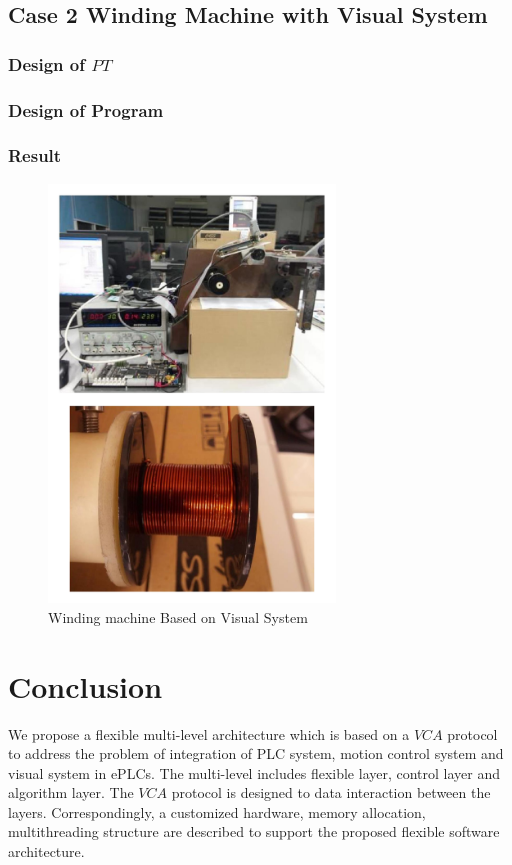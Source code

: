 \documentclass[journal,UTF8]{IEEEtran}
\begin{document}
\subsection{Case 2 Winding Machine with Visual System}

\subsubsection{Design of $PT$}

\subsubsection{Design of Program}

\subsubsection{Result}
\begin{figure}
	\centering
	\includegraphics[width=3in]{fig/Winding.pdf}
	\caption{ Winding machine Based on Visual System}
	\label{fig:Winding}
\end{figure}
\section{Conclusion}
\label{conclusion}
We propose a flexible multi-level architecture which is based on a $VCA$ protocol to address the problem of integration of PLC system, motion control system and visual system in ePLCs. The multi-level includes flexible layer, control layer and algorithm layer. The $VCA$ protocol is designed to data interaction between the layers. Correspondingly, a customized hardware, memory allocation, multithreading structure are described to support the proposed flexible software architecture.
\end{document}
